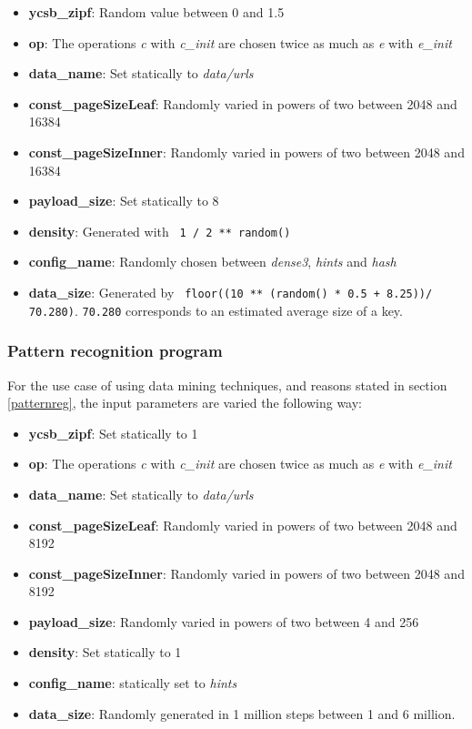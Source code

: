 \begin{itemize}
    \item \textbf{ycsb\_zipf}: Random value between 0 and 1.5 
    \item \textbf{op}: The operations \textit{c} with \textit{c\_init} are chosen twice as much as \textit{e} with \textit{e\_init} 

    \item \textbf{data\_name}: Set statically to \textit{data/urls}

    \item \textbf{const\_pageSizeLeaf}: Randomly varied in powers of two between 2048 and 16384 
    \item \textbf{const\_pageSizeInner}: Randomly varied in powers of two between 2048 and 16384 
    \item \textbf{payload\_size}: Set statically to 8
    \item \textbf{density}: Generated with \texttt{ 1 / 2 ** random()}
    \item \textbf{config\_name}: Randomly chosen between \textit{dense3}, \textit{hints} and \textit{hash}
    \item \textbf{data\_size}: Generated by \texttt{ floor((10 ** (random() * 0.5 + 8.25))/ 70.280)}. \texttt{70.280} corresponds to an estimated average size of a key.  
\end{itemize}

\subsubsection{Pattern recognition program}
For the use case of using data mining techniques, and reasons stated in section \ref{patternreg}, the input parameters are varied the following way:  
\begin{itemize}
    \item \textbf{ycsb\_zipf}: Set statically to 1 
    \item \textbf{op}: The operations \textit{c} with \textit{c\_init} are chosen twice as much as  \textit{e} with \textit{e\_init} 
    \item \textbf{data\_name}: Set statically to \textit{data/urls}
    \item \textbf{const\_pageSizeLeaf}: Randomly varied in powers of two between 2048 and 8192 
    \item \textbf{const\_pageSizeInner}: Randomly varied in powers of two between 2048 and 8192 
    \item \textbf{payload\_size}: Randomly varied in powers of two between 4 and 256
    \item \textbf{density}: Set statically to 1
    \item \textbf{config\_name}: statically set to \textit{hints}
    \item \textbf{data\_size}: Randomly generated in 1 million steps between 1 and 6 million. 
\end{itemize}


